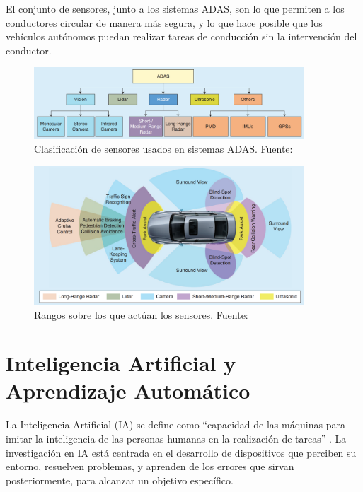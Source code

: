 \documentclass[12pt]{report} %
\begin{document}
El conjunto de sensores, junto a los sistemas ADAS, son lo que permiten a los conductores circular de manera más segura, y lo que hace posible que los vehículos autónomos puedan realizar tareas de conducción sin la intervención del conductor.

\begin{figure}[h]
	\centering
	\includegraphics[width=0.9\textwidth]{adasSensorWorkflow.png}
	\caption{Clasificación de sensores usados en sistemas ADAS. Fuente: \cite{adasSensors}}
	\label{fig:imagen21}
\end{figure}

\begin{figure}[h]
	\centering
	\includegraphics[width=0.9\textwidth]{adasSensorRange.png}
	\caption{Rangos sobre los que actúan los sensores. Fuente: \cite{adasSensors}}
	\label{fig:imagen22}
\end{figure}

\section{Inteligencia Artificial y Aprendizaje Automático}

La Inteligencia Artificial (IA) se define como “capacidad de las máquinas para imitar la inteligencia de las personas humanas en la realización de tareas” \cite{deepLearning}. La investigación en IA está centrada en el desarrollo de dispositivos que perciben su entorno, resuelven problemas, y aprenden de los errores que sirvan posteriormente, para alcanzar un objetivo específico.
\end{document}
